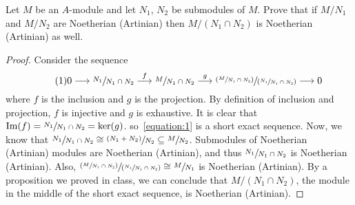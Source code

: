 \begin{problem}
    Let $M$ be an $A$-module and let $N_1$, $N_2$ be submodules of $M$.
    Prove that if $M/N_1$ and $M/N_2$ are Noetherian (Artinian) then $M/(N_1 \cap N_2)$ is Noetherian (Artinian) as well.
    \begin{sol}
        \begin{proof}
            Consider the sequence
            \[ \label{equation:1} \tag{1}
                0 \longrightarrow \sfrac{N_1}{N_1 \cap N_2} \overset{f}{\longrightarrow}
                \sfrac{M}{N_1 \cap N_2}
                \overset{g}{\longrightarrow}
                \sfrac{(\sfrac{M}{N_1 \cap N_2})}{(\sfrac{N_1}{N_1 \cap N_2})}
                \longrightarrow 0
            \]
            where $f$ is the inclusion and $g$ is the projection.
            By definition of inclusion and projection, $f$ is injective and $g$ is exhaustive.
            It is clear that $\text{Im}(f) = \sfrac{N_1}{N_1 \cap N_2} = \ker(g)$.
            so~\eqref{equation:1} is a short exact sequence.
            Now, we know that $\sfrac{N_1}{N_1 \cap N_2} \cong \sfrac{(N_1 + N_2)}{N_2} \subseteq \sfrac{M}{N_2}$.
            Submodules of Noetherian (Artinian) modules are Noetherian (Artinian),
            and thus $\sfrac{N_1}{N_1 \cap N_2}$ is Noetherian (Artinian).
            Also, $\sfrac{(\sfrac{M}{N_1 \cap N_2})}{(\sfrac{N_1}{N_1 \cap N_2})} \cong \sfrac{M}{N_1}$ is Noetherian (Artinian).
            By a proposition we proved in class, we can conclude that $M/(N_1 \cap N_2)$, the module in the middle of the short exact sequence,
            is Noetherian (Artinian).
        \end{proof}
    \end{sol}
\end{problem}